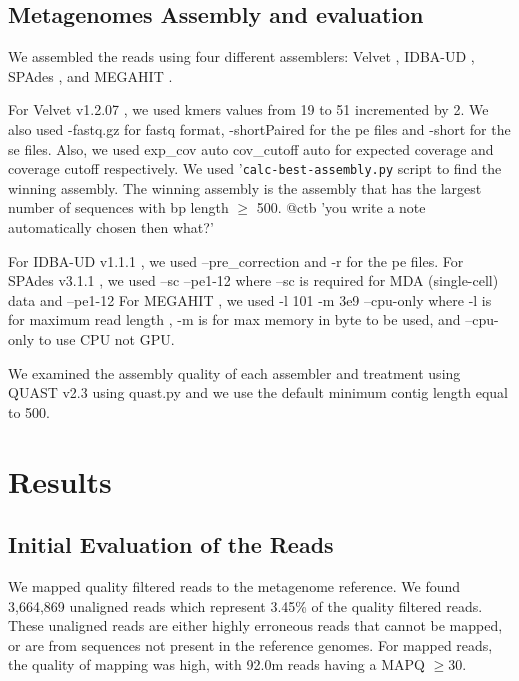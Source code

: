 \subsection*{Metagenomes Assembly and evaluation}

We assembled the reads using four different assemblers: Velvet \cite{velvet}, IDBA-UD \cite{idba}, SPAdes \cite{spades}, and MEGAHIT \cite{megahit}.

For Velvet  v1.2.07  \cite{ velvet}, we used kmers values from 19 to 51
incremented by 2. We also used -fastq.gz for fastq format,
-shortPaired for the pe files and -short for the se files. Also, we
used \-exp\_cov auto \-cov\_cutoff auto for expected coverage and coverage cutoff respectively.  We used '{\tt calc-best-assembly.py} script to find the winning assembly. The winning assembly is the assembly that has the largest number of sequences  with bp length  $\geq$  500. @ctb 'you write a note automatically chosen then what?' 

For IDBA-UD v1.1.1 \cite{idba},  we used  --pre\_correction and -r for the pe files.
For SPAdes v3.1.1 \cite{spades}, we used --sc --pe1-12   where --sc is required for MDA (single-cell) data  and --pe1-12 %
For MEGAHIT \cite{megahit}, we used -l 101 -m 3e9 --cpu-only where -l is for maximum read length , -m is for max memory in byte to be used, and --cpu-only to use CPU not GPU.


We examined the assembly quality of each assembler and treatment using
QUAST v2.3 \cite{quast} using quast.py and we use the default minimum
contig length equal to 500.


\section*{Results}

\subsection*{Initial Evaluation of the Reads}

We mapped quality filtered reads to the metagenome reference. 
We found 3,664,869 unaligned reads which represent 3.45\% of the
quality filtered reads.  These unaligned reads are either highly
erroneous reads that cannot be mapped, or are from sequences not
present in the reference genomes.  For mapped reads, the quality of
mapping was high, with 92.0m reads having a MAPQ $\geq 30$.


